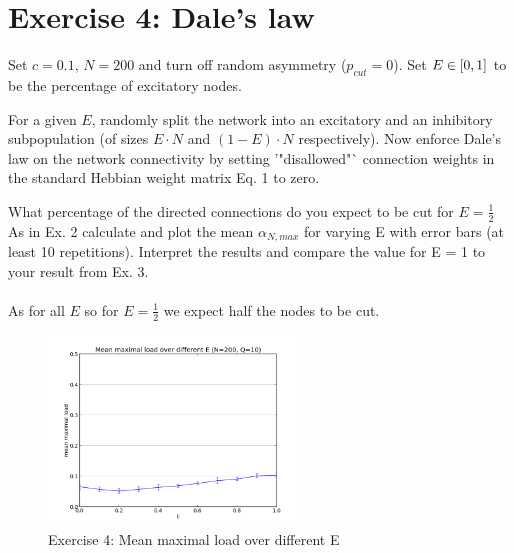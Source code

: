\section{Exercise 4: Dale's law}

\begin{itshape}
\small
Set $c=0.1$, $N = 200$ and turn off random asymmetry ($p_{cut} = 0$). Set $E \in \left[0, 1\right]$ to be the percentage of excitatory nodes.

For a given $E$, randomly split the network into an excitatory and an inhibitory subpopulation (of sizes $E \cdot N$ and $(1 - E) \cdot N$ respectively). Now enforce Dale's law on the network connectivity by setting '"disallowed"` connection weights in the standard Hebbian weight matrix Eq. 1 to zero.

What percentage of the directed connections do you expect to be cut for $E = \frac{1}{2}$
As in Ex. 2 calculate and plot the mean $\alpha_{N,max}$ for varying E with error bars (at least 10 repetitions). Interpret the results and compare the value for E = 1 to your result from Ex. 3.
\end{itshape}

\paragraph*{}

As for all $E$ so for $E = \frac{1}{2}$ we expect half the nodes to be cut.

\begin{figure}
  \vspace{-20pt}
  \begin{center}
    \includegraphics[width=0.6\textwidth]{dat/ex4-mean_max_load-N200-Q10-C95.png}
  \end{center}
  \vspace{-20pt}
  \caption{Exercise 4: Mean maximal load over different E}
  \label{fig: Question 1.3}
  \vspace{-10pt}
\end{figure}


